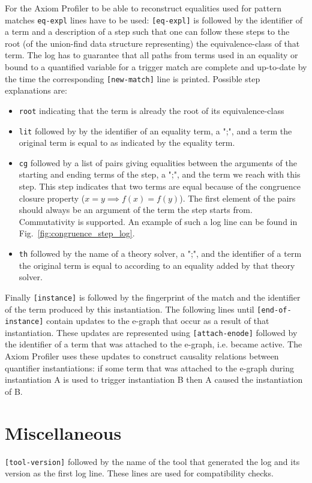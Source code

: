 \documentclass[orivec]{llncs}
\def\noskip{\vspace{-12pt}}
\newcommand*{\figref}[1]{Fig.~\ref{fig:#1}}
\begin{document}
For the Axiom Profiler to be able to reconstruct equalities used for pattern matches \texttt{eq-expl} lines have to be used: \texttt{[eq-expl]} is followed by the identifier of a term and a description of a step such that one can follow these steps to the root (of the union-find data structure representing) the equivalence-class of that term. The log has to guarantee that all paths from terms used in an equality or bound to a quantified variable for a trigger match are complete and up-to-date by the time the corresponding \texttt{[new-match]} line is printed. Possible step explanations are:
\begin{itemize}
\item \texttt{root} indicating that the term is already the root of its equivalence-class
\item \texttt{lit} followed by by the identifier of an equality term, a ";", and a term the original term is equal to as indicated by the equality term.
\item \texttt{cg} followed by a list of pairs giving equalities between the arguments of the starting and ending terms of the step, a ";", and the term we reach with this step. This step indicates that two terms are equal because of the congruence closure property ($ x = y \implies f(x) = f(y) $). The first element of the pairs should always be an argument of the term the step starts from. Commutativity is supported. An example of such a log line can be found in \figref{congruence_step_log}.
\item \texttt{th} followed by the name of a theory solver, a ";", and the identifier of a term the original term is equal to according to an equality added by that theory solver.
\end{itemize}

Finally \texttt{[instance]} is followed by the fingerprint of the match and the identifier of the term produced by this instantiation. The following lines until \texttt{[end-of-instance]} contain updates to the e-graph that occur as a result of that instantiation. These updates are represented using \texttt{[attach-enode]} followed by the identifier of a term that was attached to the e-graph, i.e. became active. The Axiom Profiler uses these updates to construct causality relations between quantifier instantiations: if some term that was attached to the e-graph during instantiation A is used to trigger instantiation B then A caused the instantiation of B.

\section{Miscellaneous}
\noskip
\texttt{[tool-version]} followed by the name of the tool that generated the log and its version as the first log line. These lines are used for compatibility checks.
\end{document}
